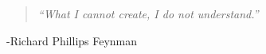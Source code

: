 
\chapter*{}

\begin{quote}
\emph{``What I cannot create, I do not understand.''}

\end{quote}

\vspace{1in}
\hspace{2in}
-Richard Phillips Feynman 